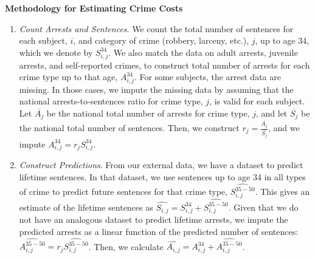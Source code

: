 \documentclass[static]{JJH-Beamer}
\begin{document}
\clearpage
\begin{frame}
 \addtocounter{framenumber}{-1}

\begin{center}
\textbf{Methodology for Estimating Crime Costs}
\end{center}

\end{frame}

\begin{frame}
 \addtocounter{framenumber}{-1}

\begin{enumerate}
\item \emph{Count Arrests and Sentences}. We count the total number of sentences for each subject, $i$, and category of crime (robbery, larceny, etc.), $j$, up to age 34,  which we denote by $S_{i,j}^{34}$. We also match the data on adult arrests, juvenile arrests, and self-reported crimes, to construct total number of  arrests for each crime type up to that age, $A_{i,j}^{34}$. For some subjects, the arrest data are missing. In those cases, we impute the missing data by assuming that the national arrests-to-sentences ratio for crime type, $j$, is valid for each subject. Let $\overline{A_j}$ be the national total number of arrests for crime type, $j$, and let $\overline{S_j}$ be the national total number of sentences. Then, we construct $r_j=\frac{\overline{A_j}}{\overline{S_j}}$, and we impute $A_{i,j}^{34}=r_j S_{i,j}^{34}$.
\end{enumerate}

\end{frame}

\begin{frame}
 \addtocounter{framenumber}{-1}

\begin{enumerate}
\setcounter{enumi}{1}
\item \emph{Construct Predictions}. From our external data, we have a dataset to predict lifetime sentences. In that dataset, we use sentences up to age 34 in all types of crime to predict future sentences for that crime type, $\widehat{S_{i,j}^{35-50}}$. This gives an estimate of the lifetime sentences as $\widehat{S_{i,j}}=S_{i,j}^{34}+\widehat{S_{i,j}^{35-50}}$. Given that we do not have an analogous dataset to predict lifetime arrests, we impute the predicted arrests as a linear function of the predicted number of sentences: $\widehat{A_{i,j}^{35-50}}=r_j \widehat{S_{i,j}^{35-50}}$. Then, we calculate $\widehat{A_{i,j}}=A_{i,j}^{34}+\widehat{A_{i,j}^{35-50}}$.
\end{enumerate}

\end{frame}
\end{document}
